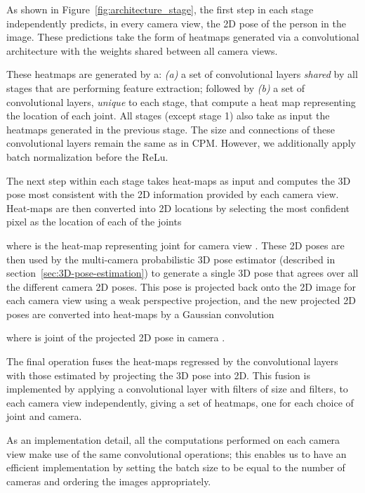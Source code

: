 \documentclass[10pt,twocolumn,letterpaper]{article}
\begin{document}
As shown in Figure~\ref{fig:architecture_stage}, the first step in each
stage independently predicts, in every camera view, the 2D pose of
the person in the image. These predictions take the form of heatmaps generated
via a convolutional architecture with the weights shared between all camera views. 

These heatmaps are generated by a: {\em (a)} a set
of convolutional layers \emph{shared} by all stages that are performing feature
extraction; followed by {\em (b)} a set of convolutional layers, \emph{unique}
to each stage, that compute a heat map representing the location of each joint.
All stages (except stage 1) also take as input the heatmaps generated
in the previous stage.
The size and connections of these convolutional layers remain the same as in
CPM\cite{wei2016convolutional}. However, we additionally apply {batch normalization}
before the ReLu.

The next step within each stage takes heat-maps as input and computes
the 3D pose most consistent with the 2D information provided by each
camera view. Heat-maps are then converted into 2D locations by
selecting the most confident pixel as the location of each of the
joints

where  is the heat-map representing joint  for camera view
. These 2D poses are then used by the multi-camera probabilistic 3D
pose estimator (described in section~\ref{sec:3D-pose-estimation}) to
generate a single 3D pose that agrees over all the different camera 2D
poses. This pose is projected back onto the 2D image for each
camera view using a weak perspective projection, and the new projected
2D poses are converted into heat-maps by a Gaussian convolution 

where  is joint  of the projected 2D
pose in camera .

The final operation fuses the heat-maps regressed by the convolutional
layers with those estimated by projecting the 3D pose into 2D. This
fusion is implemented by applying a convolutional layer with filters
of size  and 
filters, to each camera view independently, giving a set of heatmaps,
one for each choice of  joint and camera.




As an implementation detail, all the computations performed on each
camera view make use of the same convolutional operations; this
enables us to have an efficient implementation by setting the batch
size to be equal to the number of cameras and ordering the images
appropriately.
\end{document}
